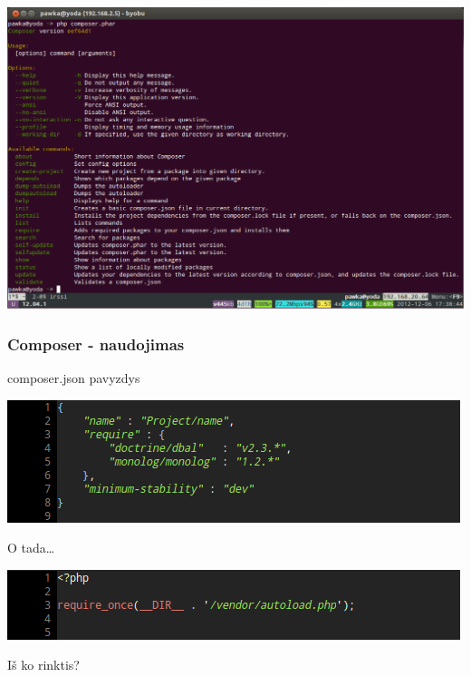 \documentclass[12pt,a4paper]{beamer}
\begin{document}
\begin{frame}

    \includegraphics[scale=0.3]{img/composer.png}
\end{frame}

\begin{frame}
    \frametitle{Composer - naudojimas}

    composer.json pavyzdys
    \begin{center}
        \includegraphics[scale=0.5]{img/composer_json.png}
    \end{center}
    \pause
    O tada\dots\\
    \begin{center}
        \includegraphics[scale=0.5]{img/autoload.png}
    \end{center}
\end{frame}

\begin{frame}[fragile]

    {\Huge Iš ko rinktis?}
\end{frame}
\end{document}
